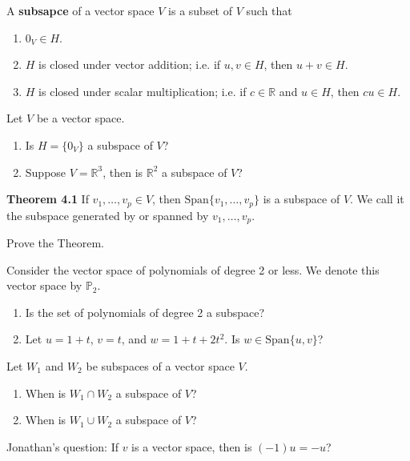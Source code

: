 \begin{enumerate}
\begin{defn}
A {\bf subsapce} of a vector space $V$ is a subset of $V$ such that
\begin{enumerate}
\item $0_V \in H$.
\item $H$ is closed under vector addition; i.e. if $u, v \in H$, then $u+v \in H$.
\item $H$ is closed under scalar multiplication; i.e. if $c \in \mathbb{R}$ and $u \in H$, then $cu \in H$.
\end{enumerate}
\end{defn}

\Problem Let $V$ be a vector space.
\begin{enumerate}
\item Is $H=\{ 0_V \}$ a subspace of $V$?

\vfill

\item Suppose $V=\mathbb{R}^3$, then is $\mathbb{R}^2$ a subspace of $V$?

\vfill

\end{enumerate}

{\bf Theorem 4.1} If $v_1, \dots, v_p \in V$, then $\text{Span}\{v_1 ,\dots, v_p\}$ is a subspace of $V$. We call it the subspace generated by or spanned by $v_1,\dots, v_p$.

\Problem Prove the Theorem.

\vfill

\newpage

\Problem Consider the vector space of polynomials of degree 2 or less. We denote this vector space by $\mathbb{P}_2$.

\begin{enumerate}
\item Is the set of polynomials of degree 2 a subspace?

\vfill

\item Let $u=1+t$, $v=t$, and $w=1+t+2t^2$. Is $w \in \text{Span}\{ u, v\}$?

\vfill

\end{enumerate}

\Problem Let $W_1$ and $W_2$ be subspaces of a vector space $V$. 

\begin{enumerate}
\item When is $W_1 \cap W_2$ a subspace of $V$?

\vfill

\item When is $W_1 \cup W_2$ a subspace of $V$?

\vfill



\end{enumerate}

\Problem Jonathan's question: If $v$ is a vector space, then is $(-1) u= -u$?

\vfill

\end{enumerate}

